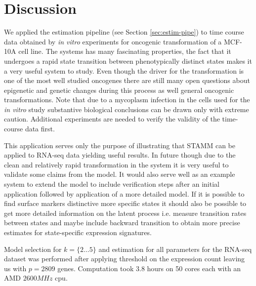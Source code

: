 \section{Discussion}
\label{sec:discussion-onco}

We applied the estimation pipeline (see Section \ref{sec:estim-pipe}) to time course data obtained by {\it in vitro} experiments for oncogenic transformation of a MCF-10A cell line. The systems has many fascinating properties, the fact that it undergoes a rapid state transition between phenotypically distinct states makes it a very useful system to study. Even though the driver for the transformation is one of the most well studied oncogenes there are still many open questions about epigenetic and genetic changes  during this process as well general oncogenic transformations. Note that due to a mycoplasm infection in  the cells used for the {\it in vitro} study substantive  biological conclusions can be drawn only with extreme caution. Additional experiments are needed to verify the validity of the time-course data first. 

This application serves only the purpose of illustrating that STAMM can be applied to RNA-seq data yielding useful results. In future though due to the clean and relatively rapid transformation in the system it is very useful to validate some claims from the model. It would also serve well as an example system to extend the model to include verification steps after an initial application followed by application of a more detailed model. If it is possible to find surface markers distinctive more specific states it should also be possible to get more detailed information on the latent process i.e. measure transition rates between states and maybe include backward transition to obtain more precise estimates for state-specific expression signatures.


Model selection for $k = \lbrace 2 \ldots 5 \rbrace$ and estimation for all parameters for the RNA-seq dataset was performed after applying threshold on the expression count leaving us with $p=2809$ genes. Computation took $3.8$ hours on 50 cores each with an AMD $2600MHz$ cpu. 



